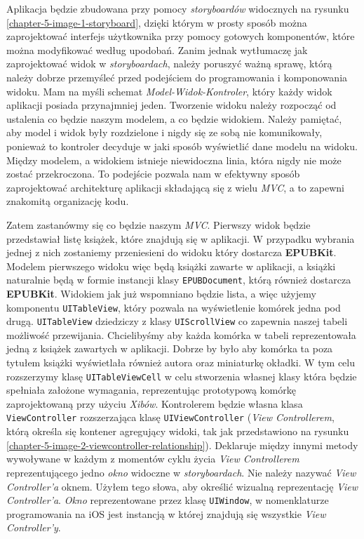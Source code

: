 Aplikacja będzie zbudowana przy pomocy \textit{storyboardów} widocznych na rysunku \ref{chapter-5-image-1-storyboard}, dzięki którym w prosty sposób można zaprojektować interfejs użytkownika przy pomocy gotowych komponentów, które można modyfikować według upodobań. Zanim jednak wytłumaczę jak zaprojektować widok w \textit{storyboardach}, należy poruszyć ważną sprawę, którą należy dobrze przemyśleć przed podejściem do programowania i komponowania widoku. Mam na myśli schemat \textit{Model-Widok-Kontroler}, który każdy widok aplikacji posiada przynajmniej jeden. Tworzenie widoku należy rozpocząć od ustalenia co będzie naszym modelem, a co będzie widokiem. Należy pamiętać, aby model i widok były rozdzielone i nigdy się ze sobą nie komunikowały, ponieważ to kontroler decyduje w jaki sposób wyświetlić dane modelu na widoku. Między modelem, a widokiem istnieje niewidoczna linia, która nigdy nie może zostać przekroczona. To podejście pozwala nam w efektywny sposób zaprojektować architekturę aplikacji składającą się z wielu \textit{MVC}, a to zapewni znakomitą organizację kodu.

Zatem zastanówmy się co będzie naszym \textit{MVC}. Pierwszy widok będzie przedstawiał listę książek, które znajdują się w aplikacji. W przypadku wybrania jednej z nich zostaniemy przeniesieni do widoku który dostarcza \textbf{EPUBKit}. Modelem pierwszego widoku więc będą książki zawarte w aplikacji, a książki naturalnie będą w formie instancji klasy \texttt{EPUBDocument}, którą również dostarcza \textbf{EPUBKit}. Widokiem jak już wspomniano będzie lista, a więc użyjemy komponentu \texttt{UITableView}, który pozwala na wyświetlenie komórek jedna pod drugą. \texttt{UITableView} dziedziczy z klasy \texttt{UIScrollView} co zapewnia naszej tabeli możliwość przewijania. Chcielibyśmy aby każda komórka w tabeli reprezentowała jedną z książek zawartych w aplikacji. Dobrze by było aby komórka ta poza tytułem książki wyświetlała również autora oraz miniaturkę okładki. W tym celu rozszerzymy klasę \texttt{UITableViewCell} w celu stworzenia własnej klasy która będzie spełniała założone wymagania, reprezentując prototypową komórkę zaprojektowaną przy użyciu \textit{Xibów}. Kontrolerem będzie własna klasa \texttt{ViewController} rozszerzająca klasę \texttt{UIViewController} (\textit{View Controllerem}, którą określa się kontener agregujący widoki, tak jak przedstawiono na rysunku \ref{chapter-5-image-2-viewcontroller-relationship}). Deklaruje między innymi metody wywoływane w każdym z momentów cyklu życia \textit{View Controllerem} reprezentującego jedno \textit{okno} widoczne w \textit{storyboardach}. Nie należy nazywać \textit{View Controller’a} oknem. Użyłem tego słowa, aby określić wizualną reprezentację \textit{View Controller’a}. \textit{Okno} reprezentowane przez klasę \texttt{UIWindow}, w nomenklaturze programowania na iOS jest instancją w której znajdują się wszystkie \textit{View Controller’y}.


